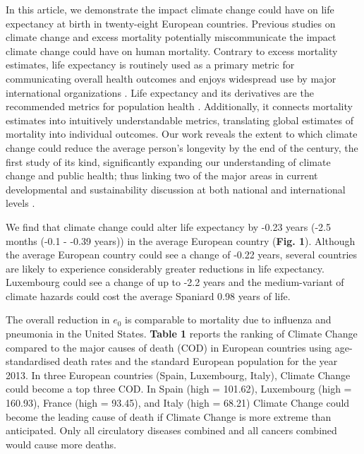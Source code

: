 \documentclass[12pt,]{article}
\begin{document}
In this article, we demonstrate the impact climate change could have on
life expectancy at birth in twenty-eight European countries. Previous
studies on climate change and excess mortality potentially
miscommunicate the impact climate change could have on human mortality.
Contrary to excess mortality estimates, life expectancy is routinely
used as a primary metric for communicating overall health outcomes and
enjoys widespread use by major international organizations
\citep{world2015world, marmot2012building, salomon2012healthy}. Life
expectancy and its derivatives are the recommended metrics for
population health \citep{parrish2010peer}. Additionally, it connects
mortality estimates into intuitively understandable metrics, translating
global estimates of mortality into individual outcomes. Our work reveals
the extent to which climate change could reduce the average person's
longevity by the end of the century, the first study of its kind,
significantly expanding our understanding of climate change and public
health; thus linking two of the major areas in current developmental and
sustainability discussion at both national and international levels
\citep{abel2016meeting}.

We find that climate change could alter life expectancy by -0.23 years
(-2.5 months (-0.1 - -0.39 years)) in the average European country
(\textbf{Fig. 1}). Although the average European country could see a
change of -0.22 years, several countries are likely to experience
considerably greater reductions in life expectancy. Luxembourg could see
a change of up to -2.2 years and the medium-variant of climate hazards
could cost the average Spaniard 0.98 years of life.

The overall reduction in \(e_0\) is comparable to mortality due to
influenza and pneumonia \citep{arias2013united} in the United States.
\textbf{Table 1} reports the ranking of Climate Change compared to the
major causes of death (COD) in European countries using age-standardised
death rates and the standard European population
\citep{pace2013revision} for the year 2013. In three European countries
(Spain, Luxembourg, Italy), Climate Change could become a top three COD.
In Spain (high = 101.62), Luxembourg (high = 160.93), France (high =
93.45), and Italy (high = 68.21) Climate Change could become the leading
cause of death if Climate Change is more extreme than anticipated. Only
all circulatory diseases combined and all cancers combined would cause
more deaths.
\end{document}
